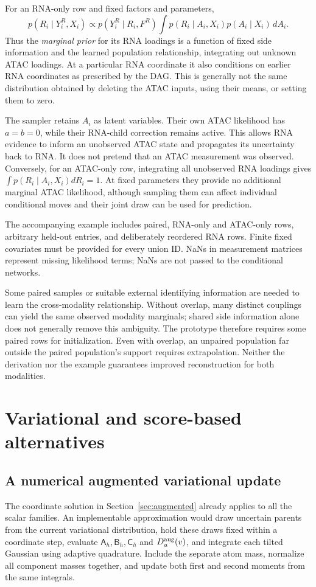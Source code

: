 For an RNA-only row and fixed factors and parameters,
\begin{equation}
p(R_i\mid Y^R_i,X_i)
\propto p(Y^R_i\mid R_i,F^R)
\int p(R_i\mid A_i,X_i)p(A_i\mid X_i)\,dA_i.
\label{eq:missingatac}
\end{equation}
Thus the \emph{marginal prior} for its RNA loadings is a function of fixed
side information and the learned population relationship, integrating out
unknown ATAC loadings. At a particular RNA coordinate it also conditions
on earlier RNA coordinates as prescribed by the DAG. This is generally
not the same distribution obtained by deleting the ATAC inputs, using
their means, or setting them to zero.

The sampler retains \(A_i\) as latent variables. Their own ATAC likelihood
has \(a=b=0\), while their RNA-child correction remains active. This
allows RNA evidence to inform an unobserved ATAC state and propagates its
uncertainty back to RNA. It does not pretend that an ATAC measurement was
observed. Conversely, for an ATAC-only row, integrating all unobserved RNA
loadings gives
\(\int p(R_i\mid A_i,X_i)dR_i=1\).
At fixed parameters they provide no additional marginal ATAC likelihood,
although sampling them can affect individual conditional moves and
their joint draw can be used for prediction.

The accompanying example includes paired, RNA-only and ATAC-only rows,
arbitrary held-out entries, and deliberately reordered RNA rows. Finite
fixed covariates must be provided for every union ID. NaNs in measurement
matrices represent missing likelihood terms; NaNs are not passed to the
conditional networks.

Some paired samples or suitable external identifying information are
needed to learn the cross-modality relationship. Without overlap, many
distinct couplings can yield the same observed modality marginals; shared
side information alone does not generally remove this ambiguity. The
prototype therefore requires some paired rows for initialization. Even
with overlap, an unpaired population far outside the paired population's
support requires extrapolation. Neither the derivation nor the example
guarantees improved reconstruction for both modalities.

\section{Variational and score-based alternatives}
\label{sec:approximation}
\subsection{A numerical augmented variational update}
The coordinate solution in Section~\ref{sec:augmented} already applies
to all the scalar families. An implementable approximation would draw
uncertain parents from the current variational distribution, hold these
draws fixed within a coordinate step, evaluate
\(\mathsf A_h,\mathsf B_h,\mathsf C_h\) and \(D_u^{\rm aug}(v)\), and
integrate each tilted Gaussian using adaptive quadrature. Include
the separate atom mass, normalize all component masses together, and
update both first and second moments from the same integrals.

